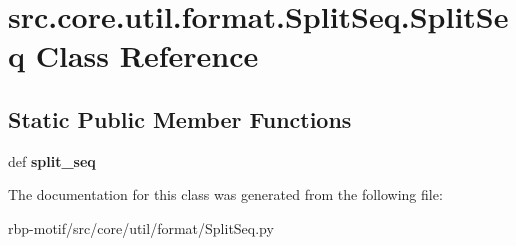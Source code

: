 \hypertarget{classsrc_1_1core_1_1util_1_1format_1_1SplitSeq_1_1SplitSeq}{\section{src.\-core.\-util.\-format.\-Split\-Seq.\-Split\-Seq Class Reference}
\label{classsrc_1_1core_1_1util_1_1format_1_1SplitSeq_1_1SplitSeq}
}
\subsection*{Static Public Member Functions}
\begin{DoxyCompactItemize}
\item 
\hypertarget{classsrc_1_1core_1_1util_1_1format_1_1SplitSeq_1_1SplitSeq_aae80668bac655071e14c23712cd26cf5}{def {\bfseries split\-\_\-seq}}\label{classsrc_1_1core_1_1util_1_1format_1_1SplitSeq_1_1SplitSeq_aae80668bac655071e14c23712cd26cf5}

\end{DoxyCompactItemize}


The documentation for this class was generated from the following file\-:\begin{DoxyCompactItemize}
\item 
rbp-\/motif/src/core/util/format/Split\-Seq.\-py\end{DoxyCompactItemize}
